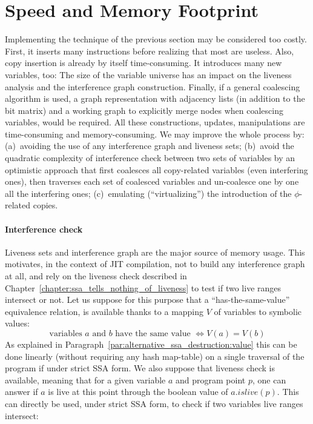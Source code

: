 \section{Speed and Memory Footprint}
Implementing the technique of the previous section may be considered too costly. 
First, it inserts many instructions before realizing that most are useless.
Also, copy insertion is already by itself time-consuming. 
It introduces many new variables, too: 
The size of the variable universe has an impact on the liveness analysis and the interference graph construction. 
Finally, if a general coalescing algorithm is used, a graph representation with adjacency lists (in addition to the bit matrix) and a working graph to explicitly merge nodes when coalescing variables, would be required. 
All these constructions, updates, manipulations are time-consuming and memory-consuming. 
We may improve the whole process by: 
(a)~avoiding the use of any interference graph and liveness sets; 
(b)~avoid the quadratic complexity of interference check between two sets of variables by an optimistic approach that first coalesces all copy-related variables (even interfering ones), then traverses each set of coalesced variables and un-coalesce one by one all the interfering ones; 
(c)~emulating (``virtualizing'') the introduction of the $\phi$-related copies.

\paragraph{Interference check}
Liveness sets and interference graph are the major source of memory usage. 
This motivates, in the context of JIT compilation, not to build any interference graph at all, and rely on the liveness check described in Chapter~\ref{chapter:ssa_tells_nothing_of_liveness} to test if two live ranges intersect or not. 
Let us suppose for this purpose that a ``has-the-same-value'' equivalence relation, is available thanks to a mapping $V$ of variables to symbolic values: 
\\
$$\textrm{variables }a\textrm{ and }b\textrm{ have the same value } \Leftrightarrow V(a)=V(b)$$
As explained in Paragraph~\ref{par:alternative_ssa_destruction:value} this can be done linearly (without requiring any hash map-table) on a single traversal of the program if under strict SSA form. 
We also suppose that liveness check is available, meaning that for a given variable $a$ and program point $p$, one can answer if $a$ is live at this point through the boolean value of  $a.\textit{islive}(p)$. This can directly be used, under strict SSA form, to check if two variables live ranges intersect:

